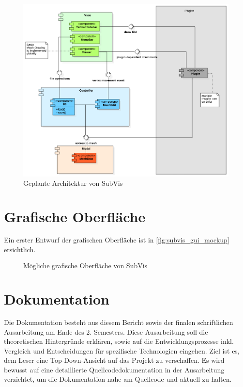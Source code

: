 \begin{figure}
  \centering
  \includegraphics[width=\textwidth]{content/media/subvis_architektur.png}
  \caption{Geplante Architektur von SubVis}
  \label{fig:subvis_architektur}
\end{figure}

\section{Grafische Oberfläche}

Ein erster Entwurf der grafischen Oberfläche ist in \autoref{fig:subvis_gui_mockup} ersichtlich.

 \begin{figure}[hp]
  \centering
  \caption{Mögliche grafische Oberfläche von SubVis}
  \label{fig:subvis_gui_mockup}
\end{figure}

\section{Dokumentation}

Die Dokumentation besteht aus diesem Bericht sowie der finalen schriftlichen Ausarbeitung am Ende des 2. Semesters.
Diese Ausarbeitung soll die theoretischen Hintergründe erklären, sowie auf die Entwicklungsprozesse inkl. Vergleich und Entscheidungen für spezifische Technologien eingehen.
Ziel ist es, dem Leser eine Top-Down-Ansicht auf das Projekt zu verschaffen.
Es wird bewusst auf eine detaillierte Quellcodedokumentation in der Ausarbeitung verzichtet, um die Dokumentation nahe am Quellcode und aktuell zu halten.

